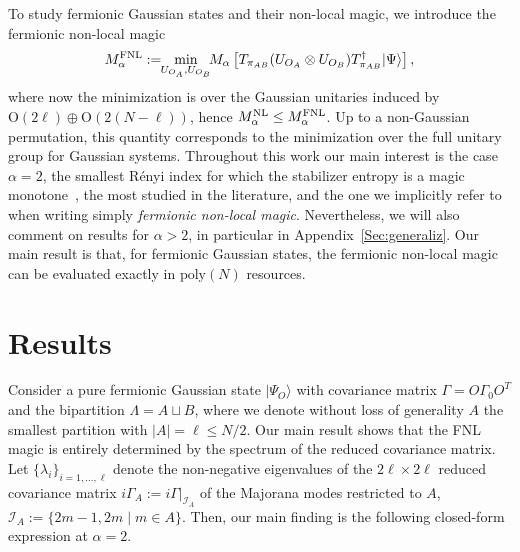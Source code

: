 \documentclass[prx,twocolumn,superscriptaddress,aps,10pt, frontmatterverbose, reprint,footinbib,longbibliography=true]{revtex4-2}
\newcommand{\RENYI}{\alpha}
\begin{document}
To study fermionic Gaussian states and their non-local magic, we introduce the fermionic non-local magic
\begin{equation}
    M_\RENYI^\textup{FNL}:= \!\!\min_{U_{O_A} , U_{O_B}} \!\!M_\RENYI\left[T_{\pi_{AB}} (U_{O_A}\otimes U_{O_B})T_{\pi_{AB}}^\dagger|\Psi\rangle\right],\label{eq:defFNLmagic}
\end{equation}
where now the minimization is over the Gaussian unitaries induced by $\mathrm{O}(2\ell)\oplus \mathrm{O}(2(N-\ell))$, hence $ M_\RENYI^\textup{NL} \leq  M_\RENYI^\textup{FNL}$. Up to a non-Gaussian permutation, this quantity corresponds to the minimization over the full unitary group for Gaussian systems.
Throughout this work our main interest is the case $\RENYI=2$, the smallest R\'enyi index for which the stabilizer entropy is a magic monotone~\cite{piro,leone2024stabilizer}, the most studied in the literature, and the one we implicitly refer to when writing simply \emph{fermionic non-local magic}. Nevertheless, we will also comment on results for $\RENYI>2$, in particular in Appendix~\ref{Sec:generaliz}.
Our main result is that, for fermionic Gaussian states, the fermionic non-local magic can be evaluated exactly in $\mathrm{poly}(N)$ resources.

\section{Results}
Consider a pure fermionic Gaussian state $|\Psi_O\rangle$ with covariance matrix $\Gamma=O \Gamma_0 O^T$ and the bipartition $\Lambda = A\sqcup B$, where we denote without loss of generality $A$ the smallest partition with $|A|=\ell\le N/2$. 
Our main result shows that the FNL magic is entirely determined by the spectrum of the reduced covariance matrix. Let $\{\lambda_i\}_{i=1,\dots,\ell}$ denote the non-negative eigenvalues of the $2\ell\times 2\ell$ reduced covariance matrix $i\Gamma_A := i\Gamma|_{\mathcal{I}_A}$ of the Majorana modes restricted to $A$, $\mathcal{I}_A:=\{2m-1,2m\;|\; m\in A\}$. Then, our main finding is the following closed-form expression at $\RENYI=2$.
\end{document}
